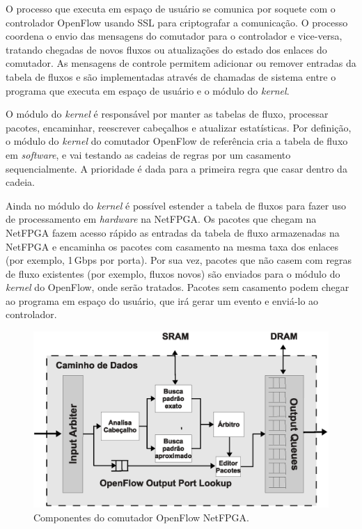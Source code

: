 O processo que executa em espaço de usuário se comunica por soquete
com o controlador OpenFlow usando SSL para criptografar a
comunicação.  O processo coordena o envio das mensagens do comutador
para o controlador e vice-versa, tratando chegadas de novos fluxos
ou atualizações do estado dos enlaces do comutador. As mensagens de
controle permitem adicionar ou remover entradas da tabela de fluxos
e são implementadas através de chamadas de sistema  entre
o programa que executa em espaço de usuário e o módulo do
\emph{kernel}.

O módulo do \emph{kernel} é responsável por manter as tabelas de fluxo,
processar pacotes, encaminhar, reescrever cabeçalhos e atualizar
estatísticas.  Por definição, o módulo do \emph{kernel} do comutador
OpenFlow de referência cria a tabela de fluxo em \emph{software}, e vai
testando as cadeias de regras por um casamento sequencialmente. A
prioridade é dada para a primeira regra que casar dentro da cadeia.

Ainda no módulo do \emph{kernel} é possível estender a tabela de
fluxos para fazer uso de processamento em \textit{hardware} na
NetFPGA.  Os pacotes que chegam na NetFPGA fazem acesso rápido as
entradas da tabela de fluxo armazenadas na NetFPGA e encaminha os
pacotes com casamento na mesma taxa dos enlaces (por exemplo,
1\,Gbps por porta). Por sua vez, pacotes que não casem com regras de
fluxo existentes (por exemplo, fluxos novos) são enviados para o
módulo do \emph{kernel} do OpenFlow, onde serão tratados.  Pacotes
sem casamento podem chegar ao programa em espaço do usuário, que irá
gerar um evento  e enviá-lo ao controlador.

\begin{figure}[h]
\centering
\includegraphics[scale=0.4]{figures/netfpga-rev/nfopenflow.eps}
\caption{Componentes do comutador OpenFlow NetFPGA.}
\label{fig:nfopenflow}
\end{figure}

